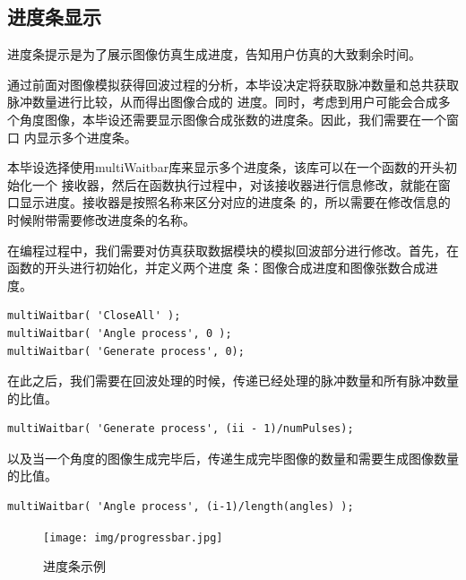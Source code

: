 \documentclass{xduugthesis}
\begin{document}
\subsection{进度条显示}
进度条提示是为了展示图像仿真生成进度，告知用户仿真的大致剩余时间。\par
通过前面对图像模拟获得回波过程的分析，本毕设决定将获取脉冲数量和总共获取脉冲数量进行比较，从而得出图像合成的
进度。同时，考虑到用户可能会合成多个角度图像，本毕设还需要显示图像合成张数的进度条。因此，我们需要在一个窗口
内显示多个进度条。\par
本毕设选择使用multiWaitbar\cite{MultiWaitBar}库来显示多个进度条，该库可以在一个函数的开头初始化一个
接收器，然后在函数执行过程中，对该接收器进行信息修改，就能在窗口显示进度。接收器是按照名称来区分对应的进度条
的，所以需要在修改信息的时候附带需要修改进度条的名称。\par
在编程过程中，我们需要对仿真获取数据模块的模拟回波部分进行修改。首先，在函数的开头进行初始化，并定义两个进度
条：图像合成进度和图像张数合成进度。\par
\begin{lstlisting}[firstnumber=72]
% Multi wait bar
multiWaitbar( 'CloseAll' );
multiWaitbar( 'Angle process', 0 );
multiWaitbar( 'Generate process', 0);
\end{lstlisting}
在此之后，我们需要在回波处理的时候，传递已经处理的脉冲数量和所有脉冲数量的比值。\par
\begin{lstlisting}[firstnumber=193]
% ii 代表已经处理的脉冲，numPulse 代表处理过的脉冲
multiWaitbar( 'Generate process', (ii - 1)/numPulses);
\end{lstlisting}
以及当一个角度的图像生成完毕后，传递生成完毕图像的数量和需要生成图像数量的比值。\par
\begin{lstlisting}[firstnumber=84]
% i 代表已经生成的图像数量，length(angles) 代表需要生成图像数量
multiWaitbar( 'Angle process', (i-1)/length(angles) );
\end{lstlisting}
\begin{figure}[!htb]
	\centering
	\texttt{[image: img/progressbar.jpg]}
	\caption{进度条示例}
\end{figure}
\end{document}
